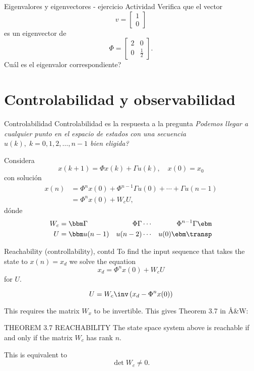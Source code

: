 \documentclass[presentation,aspectratio=1610]{beamer}
\begin{document}
\begin{frame}[label={sec:org05e9565}]{Eigenvalores y eigenvectores - ejercicio}
\alert{Actividad} Verifica que el vector 
\[ v = \begin{bmatrix}1\\0\end{bmatrix}\]
es un eigenvector de 
\[ \Phi = \begin{bmatrix} 2 & 0\\0 & \frac{1}{2} \end{bmatrix}. \]
Cuál es el eigenvalor correspondiente?
\end{frame}

\section{Controlabilidad y observabilidad}
\label{sec:org70f565f}

\begin{frame}[label={sec:org0ac3ca5}]{Controlabilidad}
Controlabilidad es la respuesta a la pregunta \emph{Podemos llegar a cualquier punto en el espacio de estados con una secuencia \(u(k),\; k=0,1,2,\ldots,n-1\) bien eligida?}

Considera
\[ x(k+1) = \Phi x(k) + \Gamma u(k), \quad x(0)= x_0 \]
con solución
\begin{equation}
\begin{split}
x(n) &= \Phi^nx(0) + \Phi^{n-1}\Gamma u(0) + \cdots + \Gamma u(n-1)\\
     &= \Phi^nx(0) + W_c U, 
\end{split}
\end{equation}
dónde
\begin{align*}
W_c &= \bbm \Gamma & \Phi\Gamma & \cdots & \Phi^{n-1}\Gamma\ebm\\
U &= \bbm u(n-1) & u(n-2) & \cdots & u(0) \ebm\transp
\end{align*}
\end{frame}

\begin{frame}[label={sec:orgd5d3d94}]{Reachability (controllability), contd}
To find the input sequence that takes the state to \(x(n) = x_d\) we solve the equation
\[ x_d = \Phi^nx(0) + W_cU\]
for \(U\). 

\[ U = W_c\inv \left(x_d - \Phi^nx(0)\right) \]

This requires the matrix \(W_x\) to be \alert{invertible}. This gives Theorem 3.7 in Å\&W:

THEOREM 3.7 REACHABILITY The state space system above is reachable if and only if the matrix \(W_c\) has rank \(n\). 

This is equivalent to 
\[ \det W_c \neq 0.\]
\end{frame}
\end{document}
